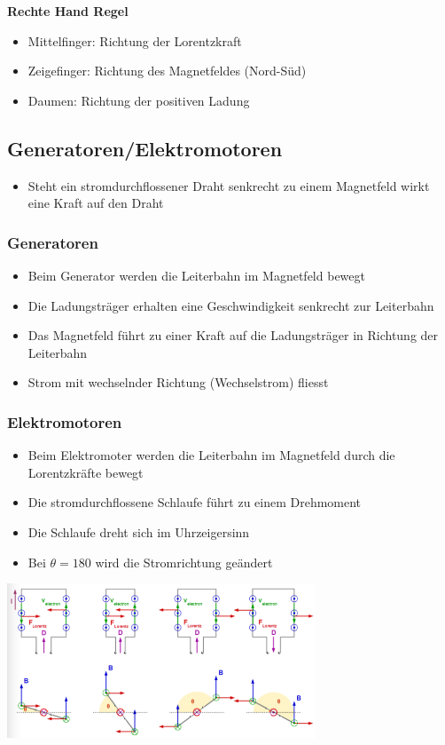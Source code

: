 \documentclass[8pt,a4paper]{scrartcl}
\begin{document}
\begin{multicols*}{3}
					\textbf{Rechte Hand Regel}
					\begin{itemize}\itemsep0pt
						\item Mittelfinger: Richtung der Lorentzkraft
						\item Zeigefinger: Richtung des Magnetfeldes (Nord-Süd)
						\item Daumen: Richtung der positiven Ladung
					\end{itemize}					
				
			\subsection{Generatoren/Elektromotoren}
				\begin{itemize}\itemsep0pt
					\item Steht ein stromdurchflossener Draht senkrecht zu einem Magnetfeld wirkt eine Kraft auf den Draht
				\end{itemize}	
			
					\subsubsection{Generatoren}
						\begin{itemize}\itemsep0pt
							\item Beim Generator werden die Leiterbahn im Magnetfeld bewegt
							\item Die Ladungsträger erhalten eine Geschwindigkeit senkrecht zur Leiterbahn
							\item Das Magnetfeld führt zu einer Kraft auf die Ladungsträger in Richtung der Leiterbahn
							\item Strom mit wechselnder Richtung (Wechselstrom) fliesst
						\end{itemize}
					\subsubsection{Elektromotoren}
						\begin{itemize}\itemsep0pt
							\item Beim Elektromoter werden die Leiterbahn im Magnetfeld durch die Lorentzkräfte bewegt
							\item Die stromdurchflossene Schlaufe führt zu einem Drehmoment
							\item Die Schlaufe dreht sich im Uhrzeigersinn
							\item Bei $\theta = 180$ wird die Stromrichtung geändert
						\end{itemize}		
						\includegraphics[height=4.6cm]{img/elemot.png} 

\end{multicols*}
\end{document}
